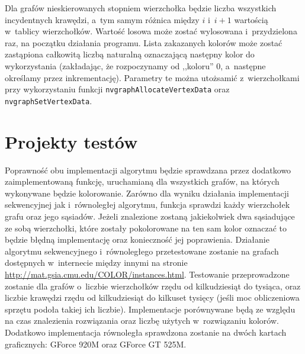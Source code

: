 \documentclass{article}
\begin{document}
	Dla grafów nieskierowanych stopniem wierzchołka będzie liczba wszystkich incydentnych krawędzi, a~tym samym różnica między $i$ i~$i+1$ wartością w~tablicy wierzchołków. Wartość losowa może zostać wylosowana i~przydzielona raz, na początku działania programu. Lista zakazanych kolorów może zostać zastąpiona całkowitą liczbą naturalną oznaczającą następny kolor do wykorzystania (zakładając, że rozpoczynamy od ,,koloru'' 0, a~następne określamy przez inkrementację). Parametry te można utożsamić z~wierzchołkami przy wykorzystaniu funkcji \texttt{nvgraphAllocateVertexData} oraz \texttt{nvgraphSetVertexData}.
	
	\section{Projekty testów}
	Poprawność obu implementacji algorytmu będzie sprawdzana przez dodatkowo zaimplementowaną funkcję, uruchamianą dla wszystkich grafów, na których wykonywane będzie kolorowanie. Zarówno dla wyniku działania implementacji sekwencyjnej jak i~równoległej algorytmu, funkcja sprawdzi każdy wierzchołek grafu oraz jego sąsiadów. Jeżeli znalezione zostaną jakiekolwiek dwa sąsiadujące ze sobą wierzchołki, które zostały pokolorowane na ten sam kolor oznaczać to będzie błędną implementację oraz konieczność jej poprawienia. Działanie algorytmu sekwencyjnego i~równoległego przetestowane zostanie na grafach dostępnych w~internecie między innymi na stronie \url{http://mat.gsia.cmu.edu/COLOR/instances.html}. Testowanie przeprowadzone zostanie dla grafów o~liczbie wierzchołków rzędu od kilkudziesiąt do tysiąca, oraz liczbie krawędzi rzędu od kilkudziesiąt do kilkuset tysięcy (jeśli moc obliczeniowa sprzętu podoła takiej ich liczbie). Implementacje porównywane będą ze względu na czas znalezienia rozwiązania oraz liczbę użytych w~rozwiązaniu kolorów. Dodatkowo implementacja równoległa sprawdzona zostanie na dwóch kartach graficznych: GForce 920M oraz GForce GT 525M.
	
	

 


\end{document}
